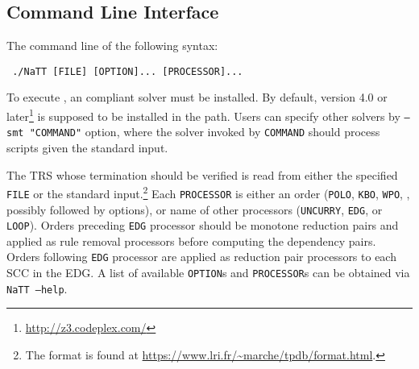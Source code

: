\documentclass{llncs}
\begin{document}
\subsection{Command Line Interface}\label{sec:command}

The command line of \NaTT {} the following syntax:
\begin{center}
\tt
	./NaTT [FILE] [OPTION]... [PROCESSOR]...
\end{center}
To execute \NaTT, an  compliant solver must be installed.
By default, \Zthree version 4.0 or later\footnote{\url{http://z3.codeplex.com/}}
is supposed to be installed in the path.
Users can specify other solvers by \texttt{--smt "COMMAND"} option,
where the solver invoked by \texttt{COMMAND}
should process  scripts given  the standard input.

The TRS whose termination should be verified is read
from either the specified \texttt{FILE} or the standard input.\footnote{
The format is found at
\url{https://www.lri.fr/~marche/tpdb/format.html}.
}
Each \texttt{PROCESSOR} is either an order 
(\eg \texttt{POLO}, \texttt{KBO}, \texttt{WPO}, \etc, possibly followed by options), or
name of other processors (\texttt{UNCURRY}, \texttt{EDG}, or \texttt{LOOP}).
Orders preceding \texttt{EDG} processor should be
monotone reduction pairs and applied as rule removal processors
before computing the dependency pairs.
Orders following \texttt{EDG} processor are applied as
reduction pair processors to each SCC in the EDG.
A list of available \texttt{OPTION}s and \texttt{PROCESSOR}s
can be obtained via \texttt{NaTT --help}.
\end{document}

